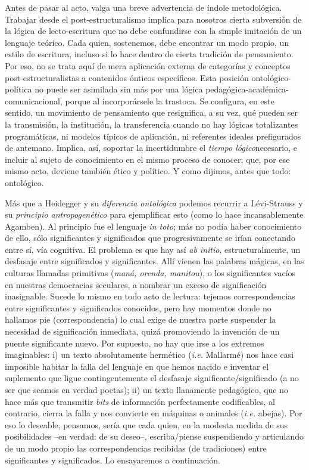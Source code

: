 Antes de pasar al acto, valga una breve advertencia de índole metodológica. Trabajar desde el post-estructuralismo implica para nosotros cierta subversión de la lógica de lecto-escritura que no debe confundirse con la simple imitación de un lenguaje teórico. Cada quien, sostenemos, debe encontrar un modo propio, un estilo de escritura, incluso si lo hace dentro de cierta tradición de pensamiento. Por eso, no se trata aquí de mera aplicación externa de categorías y conceptos post-estructuralistas a contenidos ónticos específicos. Esta posición ontológico-política no puede ser asimilada sin más por una lógica pedagógica-académica-comunicacional, porque al incorporársele la trastoca. Se configura, en este sentido, un movimiento de pensamiento que resignifica, a su vez, qué pueden ser la transmisión, la institución, la transferencia cuando no hay lógicas totalizantes programáticas, ni modelos típicos de aplicación, ni referentes ideales prefigurados de antemano. Implica, así, soportar la incertidumbre el \emph{tiempo lógico}necesario, e incluir al sujeto de conocimiento en el mismo proceso de conocer; que, por ese mismo acto, deviene también ético y político. Y como dijimos, antes que todo: ontológico.

Más que a Heidegger y su \emph{diferencia ontológica} podemos recurrir a Lévi-Strauss y su \emph{principio antropogenético} para ejemplificar esto (como lo hace incansablemente Agamben). Al principio fue el lenguaje \emph{in toto}; más no podía haber conocimiento de ello, sólo significantes y significados que progresivamente se irían conectando entre sí, vía cognitiva. El problema es que hay así \emph{ab initio}, estructuralmente, un desfasaje entre significados y significantes. Allí vienen las palabras mágicas, en las culturas llamadas primitivas (\emph{maná, orenda, manitou}), o los significantes vacíos en nuestras democracias seculares, a nombrar un exceso de significación inasignable. Sucede lo mismo en todo acto de lectura: tejemos correspondencias entre significantes y significados conocidos, pero hay momentos donde no hallamos pie (correspondencia) lo cual exige de nuestra parte suspender la necesidad de significación inmediata, quizá promoviendo la invención de un puente significante nuevo. Por supuesto, no hay que irse a los extremos imaginables: i) un texto absolutamente hermético (\emph{i.e.} Mallarmé) nos hace casi imposible habitar la falla del lenguaje en que hemos nacido e inventar el suplemento que ligue contingentemente el desfasaje significante/significado (a no ser que seamos en verdad poetas); ii) un texto llanamente pedagógico, que no hace más que transmitir \emph{bits} de información perfectamente codificables, al contrario, cierra la falla y nos convierte en máquinas o animales (\emph{i.e.} abejas). Por eso lo deseable, pensamos, sería que cada quien, en la modesta medida de sus posibilidades --en verdad: de su deseo--, escriba/piense suspendiendo y articulando de un modo propio las correspondencias recibidas (de tradiciones) entre significantes y significados. Lo ensayaremos a continuación.

